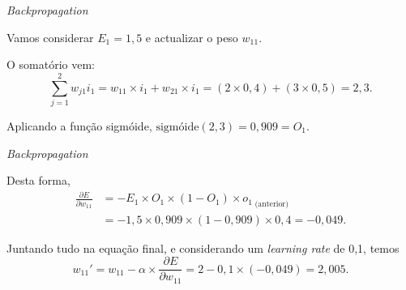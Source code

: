 \begin{frame}{\textit{Backpropagation} \cont}

    \begin{example}
    
    \begin{figure}
        \centering
        
    \end{figure}

    Vamos considerar $E_1 = 1,5$ e actualizar o peso $w_{11}$.
    
    \pauseskip
    
    O somatório vem:
    \begin{equation*}
        \sum_{j=1}^2 w_{j1} i_1 = w_{11} \times i_1 + w_{21} \times i_1 = (2 \times 0,4) + (3 \times 0,5) = 2,3. 
    \end{equation*}
    
    \pauseskip
    
    Aplicando a função sigmóide, $\text{sigmóide}(2,3) = 0,909 = O_1$.
    
    \end{example}

\end{frame}

\begin{frame}{\textit{Backpropagation} \cont}

    \begin{example}
    
    \begin{figure}
        \centering
        
    \end{figure}

    Desta forma,
    \begin{equation*}
        \begin{split}
             \frac{\partial E}{\partial w_{11}} &= -E_1 \times O_1 \times (1-O_1) \times {o_1}_{\; \text{(anterior)}} \\
            &= -1,5 \times 0,909 \times (1 - 0,909)\times0,4 = -0,049.
        \end{split}
    \end{equation*}
    
    \pauseskip
    
    Juntando tudo na equação final, e considerando um \textit{learning rate} de 0,1, temos
    \begin{equation*}
        w_{11}' = w_{11} - \alpha \times \frac{\partial E}{\partial w_{11}} =  2 - 0,1 \times (-0,049) = 2,005.
    \end{equation*}
        
    \end{example}

\end{frame}

